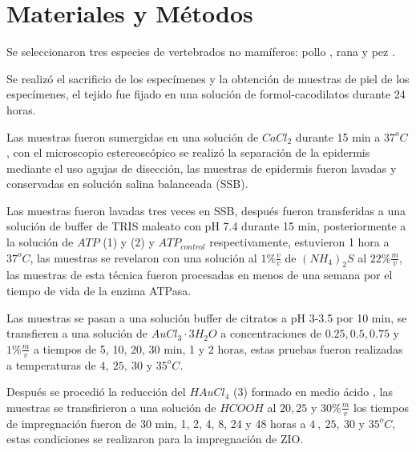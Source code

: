 \section*{Materiales y Métodos}


Se seleccionaron tres especies de vertebrados no mamíferos: pollo , rana  y pez .

Se realizó el sacrificio de los especímenes \cite{web:NOM} y la obtención de muestras de piel de los especímenes, el tejido fue fijado en una solución de formol-cacodilatos durante 24 horas.

Las muestras fueron sumergidas en una solución de $CaCl_{2}$ durante 15 min a $37^oC$ \cite{article:epidermis}, con el microscopio estereoscópico se realizó la separación de la epidermis mediante el uso agujas de disección, las muestras de epidermis fueron lavadas y conservadas en solución salina balanceada (SSB).


Las muestras fueron lavadas tres veces en SSB, después fueron transferidas a una solución de buffer de TRIS maleato con pH 7.4 durante 15 min, posteriormente a la solución de $ATP$ (1) y (2) \cite{article:ATPasaReaction} y $ATP_{control}$ respectivamente, estuvieron 1 hora a $37^oC$, las muestras se revelaron con una solución al $1\%\frac{v}{v}$ de $(NH_{4})_{2}S$ al $22\%\frac{m}{v}$, las muestras de esta técnica fueron procesadas en menos de una semana por el tiempo de vida de la enzima ATPasa.




Las muestras se pasan a una solución buffer de citratos a pH 3-3.5 por 10 min, se transfieren a una solución de $AuCl_{3}\cdot 3H_{2}O$ a concentraciones de $0.25,0.5,0.75$ y $1\% \frac{m}{v}$ a tiempos de 5, 10, 20, 30 min, 1 y 2 horas, estas pruebas fueron realizadas a temperaturas de $4,~25,~30$ y $35^oC$.

Después se procedió la reducción del $HAuCl_{4}$ (3) formado en medio ácido \cite{article:reduccionOro}, las muestras se transfirieron a una solución de $HCOOH$ al $20,25$ y $30\%\frac{m}{v}$ los tiempos de impregnación fueron de 30 min, 1, 2, 4, 8, 24 y 48 horas a $4~,~25,~30$ y $35^oC$, estas condiciones se realizaron para la impregnación de ZIO.

